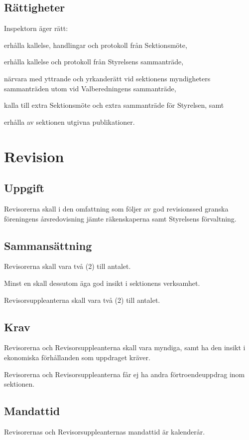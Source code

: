 \documentclass[10pt]{article}
\begin{document}
\subsection{Rättigheter}
Inspektorn äger rätt:
\begin{attlist}
\item  	erhålla kallelse, handlingar och protokoll från Sektionsmöte,
\item 	erhålla kallelse och protokoll från Styrelsens sammanträde,
\item 	närvara med yttrande och yrkanderätt vid sektionens myndigheters
    sammanträden utom vid Valberedningens sammanträde,
\item  	kalla till extra Sektionsmöte och extra sammanträde för Styrelsen, samt
\item  	erhålla av sektionen utgivna publikationer.
\end{attlist}
\newpage

\section{Revision}
\subsection{Uppgift}
Revisorerna skall i den omfattning som följer av god revisionssed granska
föreningens årsredovisning jämte räkenskaperna samt Styrelsens förvaltning.

\subsection{Sammansättning}
Revisorerna skall vara två (2) till antalet.

Minst en skall dessutom äga god insikt i sektionens verksamhet.

Revisorsuppleanterna skall vara två (2) till antalet.

\subsection{Krav}
Revisorerna och Revisorsuppleanterna skall vara myndiga, samt ha den insikt i
ekonomiska förhållanden som uppdraget kräver.

Revisorerna och Revisorsuppleanterna får ej ha andra förtroendeuppdrag inom
sektionen.

\subsection{Mandattid}
Revisorernas och Revisorsuppleanternas mandattid är kalenderår.
\end{document}
